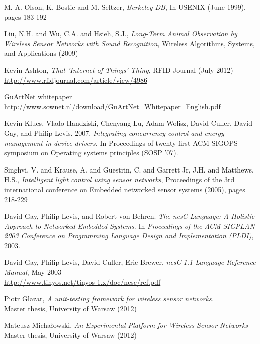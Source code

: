 \begin{thebibliography}{99}

  M. A. Olson, K. Bostic and M. Seltzer,
  \textit{Berkeley DB},
  In USENIX (June 1999), pages 183-192

  Liu, N.H. and Wu, C.A. and Hsieh, S.J.,
  \textit{Long-Term Animal Observation by Wireless Sensor Networks with Sound Recognition},
  Wireless Algorithms, Systems, and Applications (2009)

  Kevin Ashton,
  \textit{That 'Internet of Things' Thing},
  RFID Journal (July 2012) \url{http://www.rfidjournal.com/article/view/4986}

  GuArtNet whitepaper \url{http://www.sownet.nl/download/GuArtNet\_Whitepaper\_English.pdf}

  Kevin Klues, Vlado Handziski, Chenyang Lu, Adam Wolisz, David Culler, David Gay, and Philip Levis. 2007.
  \textit{Integrating concurrency control and energy management in device drivers.}
  In Proceedings of twenty-first ACM SIGOPS symposium on Operating systems principles (SOSP '07). 

  Singhvi, V. and Krause, A. and Guestrin, C. and Garrett Jr, J.H. and Matthews, H.S.,
  \textit{Intelligent light control using sensor networks},
  Proceedings of the 3rd international conference on Embedded networked sensor systems (2005), pages 218-229

  David Gay, Philip Levis, and Robert von Behren.
  \textit{The nesC Language: A Holistic Approach
  to Networked Embedded Systems}.  \newblock In
  {\em Proceedings of the ACM SIGPLAN 2003
  Conference on Programming Language Design and
  Implementation (PLDI)}, 2003.

  David Gay, Philip Levis, David Culler, Eric Brewer,
  \textit{nesC 1.1 Language Reference Manual},
  May 2003 \\
  \url{http://www.tinyos.net/tinyos-1.x/doc/nesc/ref.pdf}


  Piotr Glazar, \textit{A unit-testing framework
  for wireless sensor networks.} \\ Master thesis,
  University of Warsaw (2012)

  Mateusz Michałowski, \textit{An Experimental Platform
  for Wireless Sensor Networks} \\ Master thesis,
  University of Warsaw (2012)


\end{thebibliography}
